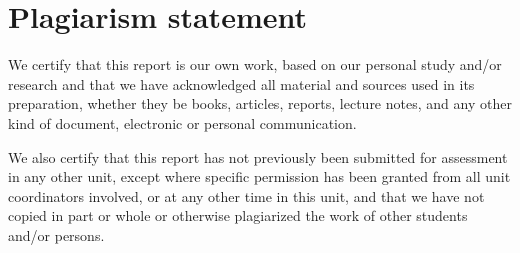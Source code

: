 \section*{Plagiarism statement}

We certify that this report is our own work, based on our personal study and/or research and that we have acknowledged all material and sources used in its preparation, whether they be books, articles, reports, lecture notes, and any other kind of document, electronic or personal communication.

We also certify that this report has not previously been submitted for assessment in any other unit, except where specific permission has been granted from all unit coordinators involved, or at any other time in this unit, and that we have not copied in part or whole or otherwise plagiarized the work of other students and/or persons.
